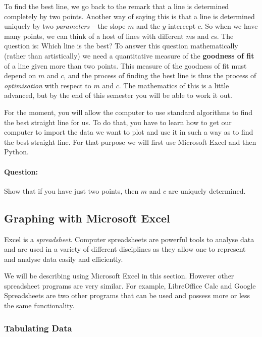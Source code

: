To find the best line, we go back to the remark that a line is determined completely by two points. Another way of saying this is that a line is determined uniquely by two \textit{parameters} -- the slope $m$ and the $y$-intercept $c$. So when we have many points, we can think of a host of lines with different $m$s and $c$s. The question is: Which line is the best? To answer this question mathematically (rather than artistically) we need a quantitative measure of the \textbf{goodness of fit} of a line given more than two points. This measure of the goodness of fit must depend on $m$ and $c$, and the process of finding the best line is thus the process of \textit{optimisation} with respect to $m$ and $c$. The mathematics of this is a little advanced, but by the end of this semester you will be able to work it out. 

For the moment, you will allow the computer to use standard algorithms to find the best straight line for us. To do that, you have to learn how to get our computer to import the data we want to plot and use it in such a way as to find the best straight line. For that purpose we will first use Microsoft Excel and then Python. 

\begin{question}
\paragraph{Question:} Show that if you have just two points, then $m$ and $c$ are uniquely determined. 
\end{question}


\subsection{Graphing with Microsoft Excel}

Excel is a \textit{spreadsheet}. Computer spreadsheets are powerful tools to analyse data and are used in a variety of different disciplines as they allow one to represent and analyse data easily and efficiently. 

\begin{tip}
We will be describing using Microsoft Excel in this section. However other spreadsheet programs are very similar. For example, LibreOffice Calc and Google Spreadsheets are two other programs that can be used and possess more or less the same functionality.
\end{tip}

\subsubsection{Tabulating Data}

